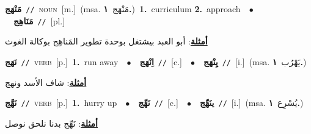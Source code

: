 \documentclass[10pt,a4paper,twoside]{article} %
\begin{document}
\begin{multicols}{2}
{\setlength\topsep{0pt}\textbf{\foreignlanguage{arabic}{مَنْهَج}}\ {\color{gray}\texttt{//}\color{black}}\ \textsc{noun}\ [m.]\ \color{gray}(msa. \foreignlanguage{arabic}{مَنْهَج}~\foreignlanguage{arabic}{\textbf{١.}})\color{black}\ \textbf{1.}~curriculum  \textbf{2.}~approach\ \ $\bullet$\ \ \setlength\topsep{0pt}\textbf{\foreignlanguage{arabic}{مَنَاهِج}}\ {\color{gray}\texttt{//}\color{black}}\ [pl.]\  \begin{flushright}\color{gray}\foreignlanguage{arabic}{\textbf{\underline{\foreignlanguage{arabic}{أمثلة}}}: أبو العبد بيشتغل بوحدة تطوير المَناهِج بوكالة الغوث}\end{flushright}\color{black}} \vspace{2mm}

{\setlength\topsep{0pt}\textbf{\foreignlanguage{arabic}{نَهَج}}\ {\color{gray}\texttt{//}\color{black}}\ \textsc{verb}\ [p.]\ \textbf{1.}~run away\ \ $\bullet$\ \ \setlength\topsep{0pt}\textbf{\foreignlanguage{arabic}{اِنْهَج}}\ {\color{gray}\texttt{//}\color{black}}\ [c.]\ \ $\bullet$\ \ \setlength\topsep{0pt}\textbf{\foreignlanguage{arabic}{يِنْهَج}}\ {\color{gray}\texttt{//}\color{black}}\ [i.]\ \color{gray}(msa. \foreignlanguage{arabic}{يَهْرُب}~\foreignlanguage{arabic}{\textbf{١.}})\color{black}\  \begin{flushright}\color{gray}\foreignlanguage{arabic}{\textbf{\underline{\foreignlanguage{arabic}{أمثلة}}}: شاف الأسد ونهج}\end{flushright}\color{black}} \vspace{2mm}

{\setlength\topsep{0pt}\textbf{\foreignlanguage{arabic}{نَهَّج}}\ {\color{gray}\texttt{//}\color{black}}\ \textsc{verb}\ [p.]\ \textbf{1.}~hurry up\ \ $\bullet$\ \ \setlength\topsep{0pt}\textbf{\foreignlanguage{arabic}{نَهِّج}}\ {\color{gray}\texttt{//}\color{black}}\ [c.]\ \ $\bullet$\ \ \setlength\topsep{0pt}\textbf{\foreignlanguage{arabic}{ينَهِّج}}\ {\color{gray}\texttt{//}\color{black}}\ [i.]\ \color{gray}(msa. \foreignlanguage{arabic}{يُسْرِع}~\foreignlanguage{arabic}{\textbf{١.}})\color{black}\  \begin{flushright}\color{gray}\foreignlanguage{arabic}{\textbf{\underline{\foreignlanguage{arabic}{أمثلة}}}: نَهِّج بدنا نلحق نوصل}\end{flushright}\color{black}} \vspace{2mm}


\end{multicols}
\end{document}
